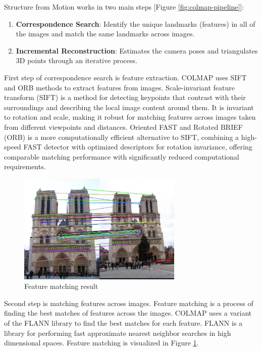 Structure from Motion works in two main steps [Figure
\ref{fig:colmap-pipeline}]:
\begin{enumerate}
  \item \textbf{Correspondence Search}: Identify the unique landmarks
    (features) in all of the images and match the same landmarks across images.
  \item \textbf{Incremental Reconstruction}: Estimates the camera
    poses and triangulates 3D points through an iterative process.
\end{enumerate}

First step of correspondence search is feature extraction. COLMAP
uses SIFT \cite{sift} and ORB \cite{orb} methods to extract features
from images. Scale-invariant feature transform (SIFT) is a method for
detecting keypoints that contrast with their surroundings and
describing the local image content around them. It is invariant to
rotation and scale, making it robust for matching features across images taken from different viewpoints and distances. Oriented FAST and Rotated BRIEF (ORB) is a more
computationally efficient alternative to SIFT, combining a high-speed
FAST detector with optimized descriptors for rotation invariance,
offering comparable matching performance with significantly reduced computational requirements.

\begin{figure}[h]
  \centering
  \includegraphics[width=0.7\textwidth]{images/related-work/feature-matching.jpg}
  \caption{Feature matching result}
  \label{fig:matching-features}
\end{figure}

Second step is matching features across images. Feature matching is a
process of finding the best matches of features across the images.
COLMAP uses a variant of the FLANN \cite{flann} library to find the
best matches for each feature. FLANN is a library for performing fast
approximate nearest neighbor searches in high dimensional spaces.
Feature matching is visualized in Figure \ref{fig:matching-features}.

